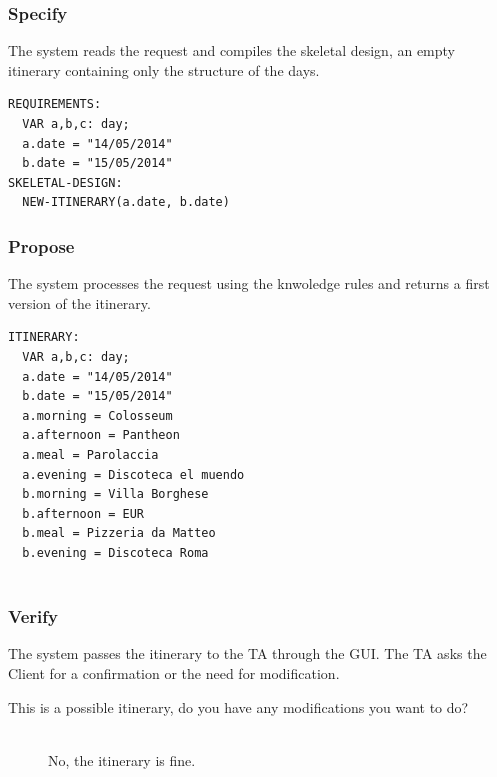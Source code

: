 \documentclass[11pt]{article} %
\begin{document}
\subsubsection{Specify}
The system reads the request and compiles the skeletal design, an empty itinerary containing only the structure of the days.

\begin{lstlisting}[breaklines=true,mathescape=true]
REQUIREMENTS:
  VAR a,b,c: day;
  a.date = "14/05/2014"
  b.date = "15/05/2014"
SKELETAL-DESIGN:
  NEW-ITINERARY(a.date, b.date)
\end{lstlisting}

\subsubsection{Propose}
The system processes the request using the knwoledge rules and returns a first version of the itinerary.

\begin{lstlisting}[breaklines=true,mathescape=true]
ITINERARY:
  VAR a,b,c: day;
  a.date = "14/05/2014"
  b.date = "15/05/2014"
  a.morning = Colosseum
  a.afternoon = Pantheon
  a.meal = Parolaccia
  a.evening = Discoteca el muendo
  b.morning = Villa Borghese
  b.afternoon = EUR
  b.meal = Pizzeria da Matteo
  b.evening = Discoteca Roma
  
\end{lstlisting}

\subsubsection{Verify}
The system passes the itinerary to the TA through the GUI. The TA asks the Client for a confirmation or the need for modification.

\begin{description}
  \item[This is a possible itinerary, do you have any modifications you want to do?] \hfill \\
  No, the itinerary is fine.
\end{description}




\clearpage
\end{document}
